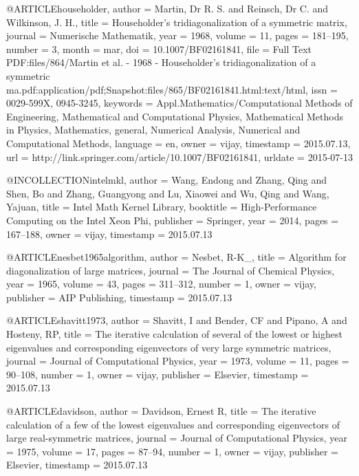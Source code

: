 @ARTICLE{householder,
  author = {Martin, Dr R. S. and Reinsch, Dr C. and Wilkinson, J. H.},
  title = {Householder's tridiagonalization of a symmetric matrix},
  journal = {Numerische Mathematik},
  year = {1968},
  volume = {11},
  pages = {181--195},
  number = {3},
  month = mar,
  doi = {10.1007/BF02161841},
  file = {Full Text PDF:files/864/Martin et al. - 1968 - Householder's tridiagonalization of a symmetric ma.pdf:application/pdf;Snapshot:files/865/BF02161841.html:text/html},
  issn = {0029-599X, 0945-3245},
  keywords = {Appl.Mathematics/Computational Methods of Engineering, Mathematical
	and Computational Physics, Mathematical Methods in Physics, Mathematics,
	general, Numerical Analysis, Numerical and Computational Methods},
  language = {en},
  owner = {vijay},
  timestamp = {2015.07.13},
  url = {http://link.springer.com/article/10.1007/BF02161841},
  urldate = {2015-07-13}
}

@INCOLLECTION{intelmkl,
  author = {Wang, Endong and Zhang, Qing and Shen, Bo and Zhang, Guangyong and
	Lu, Xiaowei and Wu, Qing and Wang, Yajuan},
  title = {Intel Math Kernel Library},
  booktitle = {High-Performance Computing on the Intel{\textregistered} Xeon Phi},
  publisher = {Springer},
  year = {2014},
  pages = {167--188},
  owner = {vijay},
  timestamp = {2015.07.13}
}

@ARTICLE{nesbet1965algorithm,
  author = {Nesbet, R-K\_},
  title = {Algorithm for diagonalization of large matrices},
  journal = {The Journal of Chemical Physics},
  year = {1965},
  volume = {43},
  pages = {311--312},
  number = {1},
  owner = {vijay},
  publisher = {AIP Publishing},
  timestamp = {2015.07.13}
}

@ARTICLE{shavitt1973,
  author = {Shavitt, I and Bender, CF and Pipano, A and Hosteny, RP},
  title = {The iterative calculation of several of the lowest or highest eigenvalues
	and corresponding eigenvectors of very large symmetric matrices},
  journal = {Journal of Computational Physics},
  year = {1973},
  volume = {11},
  pages = {90--108},
  number = {1},
  owner = {vijay},
  publisher = {Elsevier},
  timestamp = {2015.07.13}
}

@ARTICLE{davidson,
  author = {Davidson, Ernest R},
  title = {The iterative calculation of a few of the lowest eigenvalues and
	corresponding eigenvectors of large real-symmetric matrices},
  journal = {Journal of Computational Physics},
  year = {1975},
  volume = {17},
  pages = {87--94},
  number = {1},
  owner = {vijay},
  publisher = {Elsevier},
  timestamp = {2015.07.13}
}

